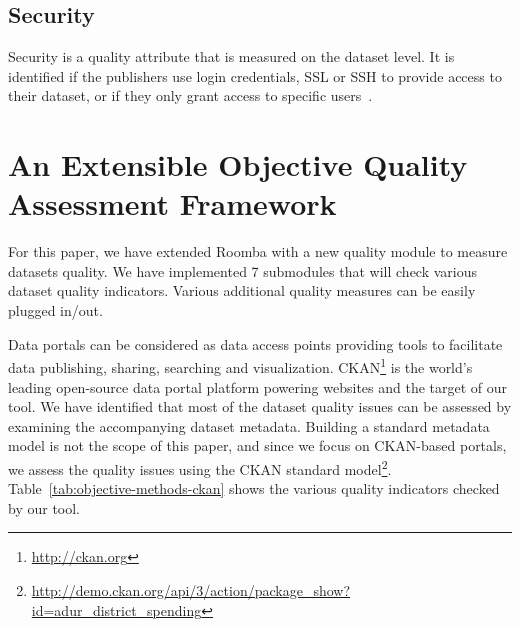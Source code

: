 \subsection{Security}
Security is a quality attribute that is measured on the dataset level. It is identified if the publishers use login credentials, SSL or SSH to provide access to their dataset, or if they only grant access to specific users~\cite{Zaveri:SemWebJorunal:12}.



\section{An Extensible Objective Quality Assessment Framework}
\label{section:assessment-framework}


For this paper, we have extended Roomba with a new quality module to measure datasets quality. We have implemented 7 submodules that will check various dataset quality indicators. Various additional quality measures can be easily plugged in/out.

Data portals can be considered as data access points providing tools to facilitate data publishing, sharing, searching and visualization. CKAN\footnote{\url{http://ckan.org}} is the world's leading open-source data portal platform powering websites and the target of our tool. We have identified that most of the dataset quality issues can be assessed by examining the accompanying dataset metadata. Building a standard metadata model is not the scope of this paper, and since we focus on CKAN-based portals, we assess the quality issues using the CKAN standard model\footnote{\url{http://demo.ckan.org/api/3/action/package_show?id=adur_district_spending}}. Table~\ref{tab:objective-methods-ckan} shows the various quality indicators checked by our tool.

